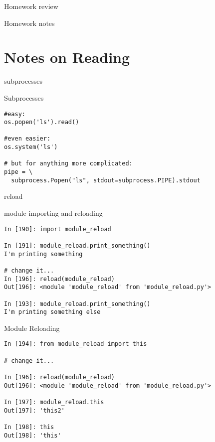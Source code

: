 \documentclass{beamer}
\begin{document}
\begin{frame}{Homework review}

  {\Large Homework notes }

\end{frame}

\section {Notes on Reading}

\begin{frame}[fragile]{subprocesses}

{\Large Subprocesses}
\begin{verbatim}
#easy:  
os.popen('ls').read()

#even easier:
os.system('ls')

# but for anything more complicated:
pipe = \
  subprocess.Popen("ls", stdout=subprocess.PIPE).stdout 
\end{verbatim}

\end{frame}


\begin{frame}[fragile]{reload}

{\Large module importing and reloading}
\begin{verbatim}
In [190]: import module_reload

In [191]: module_reload.print_something()
I'm printing something

# change it...
In [196]: reload(module_reload)
Out[196]: <module 'module_reload' from 'module_reload.py'>

In [193]: module_reload.print_something()
I'm printing something else
\end{verbatim}

\end{frame}

\begin{frame}[fragile]{Module Reloading}

\begin{verbatim}
In [194]: from module_reload import this

# change it...

In [196]: reload(module_reload)
Out[196]: <module 'module_reload' from 'module_reload.py'>

In [197]: module_reload.this
Out[197]: 'this2'

In [198]: this
Out[198]: 'this'
\end{verbatim}

\end{frame}
\end{document}
